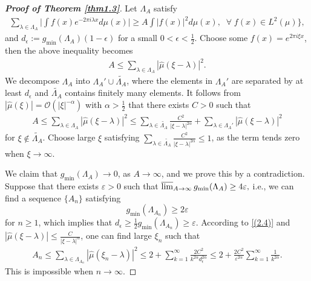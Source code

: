 \documentclass[12pt,psfig,reqno]{amsart}
\numberwithin{equation}{section}
\theoremstyle{plain}
\begin{document}
\begin{proof}[\textbf{Proof of Theorem \ref{thm1.3}}]
	Let $\Lambda_A$ satisfy 
	\begin{align*}
		\sum_{\lambda\in\Lambda_A}\Big|\int f(x)e^{-2\pi i\lambda x}d\mu(x)\Big|\geq A\int|f(x)|^2d\mu(x),\;\;\forall\;f(x)\in L^2(\mu)\}, 
	\end{align*}
	and $d_\epsilon:=g_{\min}(\Lambda_A)(1-\epsilon)
	$ for a small $0<\epsilon<\frac12$. 
	Choose some $f(x)=e^{2\pi i\xi x}$, then the above  inequality becomes 
	\begin{align*}
		A\leq \sum_{\lambda\in\Lambda_A}|\widehat{\mu}(\xi-\lambda)|^2.
	\end{align*}
	We decompose $\Lambda_A$ into $\Lambda_A' \cup \widetilde{\Lambda_A}$, where the elements in $\Lambda_A'$ are separated by at least $d_\epsilon$ and $\widetilde{\Lambda_A}$ contains finitely many elements.
It follows from $|\widehat{\mu}(\xi)|=\mathcal{O}(|\xi|^{-\alpha})$ with $\alpha>\frac12$ that there exists $C>0$ such that 
	\begin{align}\label{(2.4)}
		A\leq \sum_{\lambda\in\Lambda_A}|\widehat{\mu}(\xi-\lambda)|^2\leq 
		\sum_{\lambda\in\widetilde{\Lambda_A}}\frac{C^2}{|\xi-\lambda|^{2\alpha}}+\sum_{\lambda\in\Lambda_A'}|\widehat{\mu}(\xi-\lambda)|^2
	\end{align}
	for $\xi\not\in\widetilde{\Lambda_A}$. 
	Choose large $\xi$ satisfying $\sum_{\lambda\in\widetilde{\Lambda_A}}\frac{C^2}{|\xi-\lambda|^{2\alpha} }\leq 1$, as the term tends zero when $\xi\rightarrow\infty$. 

We claim that $g_{\min}(\Lambda_A)\rightarrow0$, as $A\rightarrow\infty$, and we prove this by a contradiction. 
Suppose that there exists $\varepsilon>0$ such that $
\varlimsup_{A\rightarrow\infty}g_{\min}(\Lambda_A)\geq 4\varepsilon,
$ i.e., we can find a sequence $\{A_n\}$ satisfying 
$$
g_{\min}(\Lambda_{A_n})\geq 2\varepsilon
$$
for $n\geq1$, which implies that  $d_\epsilon\geq\frac12g_{\min}(\Lambda_{A_n})\geq \varepsilon$. 
According to \eqref{(2.4)} and $|\widehat{\mu}(\xi-\lambda)|\leq \frac{C}{|\xi-\lambda|^\alpha}$, one can find large $\xi_n$ such that 
\begin{align*}
			A_n\leq \sum_{\lambda\in\Lambda_{A_n}}|\widehat{\mu}(\xi_n-\lambda)|^2\leq 
2+\sum_{k=1}^\infty \frac{2C^2}{k^{2\alpha}d_\epsilon^{2\alpha}}
\leq 2+\frac{2C^2}{\varepsilon^{2\alpha}}\sum_{k=1}^\infty \frac{1}{k^{2\alpha}}.
\end{align*}
This is impossible when $n\rightarrow\infty$. 


\end{proof}
\end{document}
